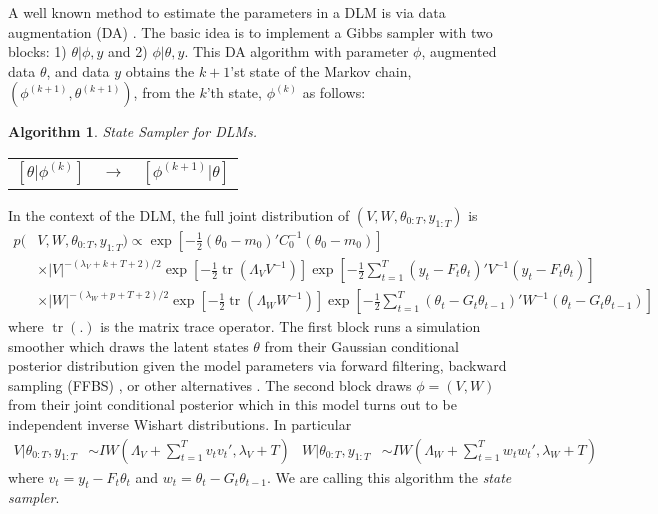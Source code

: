 \documentclass{article}
\newtheorem{alg}{Algorithm}
\DeclareMathOperator{\tr}{tr}
\begin{document}
A well known method to estimate the parameters in a DLM is via data augmentation (DA) \cite{fruhwirth1994data,carter1994gibbs}. The basic idea is to implement a Gibbs sampler with two blocks: 1) $\theta|\phi,y$ and 2) $\phi|\theta,y$. This DA algorithm with parameter $\phi$, augmented data $\theta$, and data $y$ obtains the $k+1$'st state of the Markov chain, $(\phi^{(k+1)},\theta^{(k+1)})$, from the $k$'th state, $\phi^{(k)}$ as follows:
\begin{alg}State Sampler for DLMs.\label{alg:DA}\\
  \begin{center}
    \begin{tabular}{lll}
      $[\theta|\phi^{(k)}]$& $\to$& $[\phi^{(k+1)}|\theta]$
    \end{tabular}
  \end{center}
\noindent \end{alg}
In the context of the DLM, the full joint distribution of $(V,W,\theta_{0:T},y_{1:T})$ is
\begin{align}
  p(&V,W,\theta_{0:T},y_{1:T}) \propto \exp\left[-\frac{1}{2}(\theta_0-m_0)'C_0^{-1}(\theta_0-m_0)\right] \nonumber\\
  &\times   |V|^{-(\lambda_V + k + T + 2)/2}\exp\left[-\frac{1}{2}\tr\left(\Lambda_VV^{-1}\right)\right] \exp\left[-\frac{1}{2}\sum_{t=1}^T(y_t - F_t\theta_t)'V^{-1}(y_t - F_t\theta_t)\right] \nonumber\\
   & \times |W|^{-(\lambda_W + p + T + 2)/2}\exp\left[-\frac{1}{2}\tr\left(\Lambda_WW^{-1}\right)\right]\exp\left[-\frac{1}{2}\sum_{t=1}^T(\theta_t-G_t\theta_{t-1})'W^{-1}(\theta_t-G_t\theta_{t-1})\right]\label{dlmjoint}
 \end{align}
where $\tr(.)$ is the matrix trace operator. The first block runs a simulation smoother which draws the latent states $\theta$ from their Gaussian conditional posterior distribution given the model parameters via forward filtering, backward sampling (FFBS) \cite{fruhwirth1994data,carter1994gibbs}, or other alternatives \cite{koopman1993disturbance,de1995simulation,mccausland2011simulation}. The second block draws $\phi=(V,W)$ from their joint conditional posterior which in this model turns out to be independent inverse Wishart distributions. In particular
\begin{align}
  V|\theta_{0:T},y_{1:T} &\sim IW\left(\Lambda_V + \sum_{t=1}^Tv_tv_t',\lambda_V + T\right) &
  W|\theta_{0:T},y_{1:T} &\sim IW\left(\Lambda_W + \sum_{t=1}^Tw_tw_t',\lambda_{W} + T\right) \label{eq:VWcond}
\end{align}
where $v_t = y_t - F_t\theta_t$ and $w_t = \theta_t - G_t\theta_{t-1}$. We are calling this algorithm the {\it state sampler}.
\end{document}
